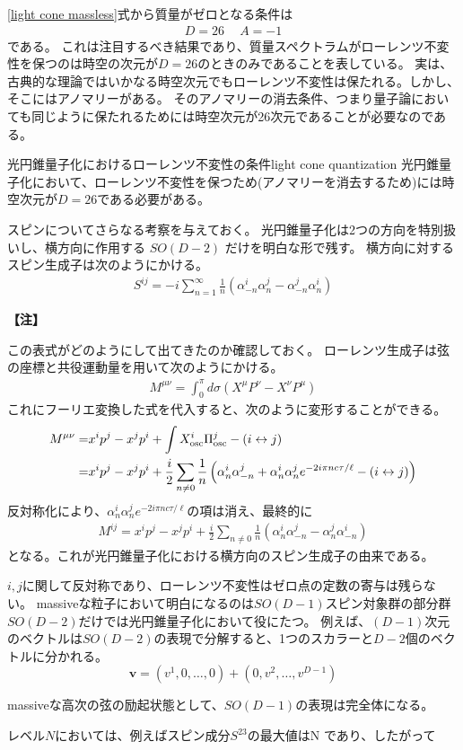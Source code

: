\documentclass[11pt, dvipdfmx]{article}
\numberwithin{equation}{section}
\newcommand{\blankline}{\par\vspace{\baselineskip}} %
\newenvironment{note}{
    \vspace{1ex} %
    \par\footnotesize\noindent\textbf{【注】}
}{
    \par\vspace{1ex} %
}
\begin{document}
\eqref{light cone massless}式から質量がゼロとなる条件は
\begin{align}
  D = 26\ \quad A=-1
\end{align}
である。
これは注目するべき結果であり、質量スペクトラムがローレンツ不変性を保つのは時空の次元が$D=26$のときのみであることを表している。
実は、古典的な理論ではいかなる時空次元でもローレンツ不変性は保たれる。しかし、そこにはアノマリーがある。
そのアノマリーの消去条件、つまり量子論においても同じように保たれるためには時空次元が26次元であることが必要なのである。
\begin{mythm}{光円錐量子化におけるローレンツ不変性の条件}{light cone quantization}
    光円錐量子化において、ローレンツ不変性を保つため(アノマリーを消去するため)には時空次元が$D=26$である必要がある。
\end{mythm}
スピンについてさらなる考察を与えておく。
光円錐量子化は2つの方向を特別扱いし、横方向に作用する $SO(D-2)$ だけを明白な形で残す。
横方向に対するスピン生成子は次のようにかける。
\begin{align}
    S^{ij} = -i \sum_{n=1}^{\infty} \frac{1}{n} \left( \alpha^i_{-n} \alpha^j_n - \alpha^j_{-n} \alpha^i_n \right)
\end{align}
\begin{note}
    この表式がどのようにして出てきたのか確認しておく。
    ローレンツ生成子は弦の座標と共役運動量を用いて次のようにかける。
    \begin{align}
        M^{\mu\nu} = \int_0^\pi d\sigma \left( X^\mu P^\nu - X^\nu P^\mu \right)
    \end{align}
    これにフーリエ変換した式を代入すると、次のように変形することができる。
    \begin{align}
        M^{\mu\nu}=&x^ip^j - x^jp^i+\int X^i_{\text{osc}}\Pi^j_{\text{osc}} -(i \leftrightarrow j)\notag\\
        =& x^ip^j - x^jp^i+\frac{i}{2}\sum_{n\neq0}\frac{1}{n}\left(\alpha^i_n\alpha^j_{-n} + \alpha^i_n\alpha^j_n e^{-2i\pi nc\tau/\ell}- (i \leftrightarrow j)\right)
    \end{align}
   反対称化により、$\alpha^i_n\alpha^j_n e^{-2i\pi nc\tau/\ell}$の項は消え、最終的に
   \begin{align}
       M^{ij} = x^i p^j - x^j p^i + \frac{i}{2} \sum_{n\neq0} \frac{1}{n} \left( \alpha^i_n \alpha^j_{-n} - \alpha^j_n \alpha^i_{-n} \right)
   \end{align}
   となる。これが光円錐量子化における横方向のスピン生成子の由来である。
\end{note}
    $i,j$に関して反対称であり、ローレンツ不変性はゼロ点の定数の寄与は残らない。
   massiveな粒子において明白になるのは$SO(D-1)$スピン対象群の部分群$SO(D-2)$だけでは光円錐量子化において役にたつ。
   例えば、$(D-1)$次元のベクトルは$SO(D-2)$の表現で分解すると、1つのスカラーと$D-2$個のベクトルに分かれる。
   \[\mathbf v = (v^1, 0, \dots, 0) + (0, v^2, \dots, v^{D-1})\]
\blankline
   massiveな高次の弦の励起状態として、$SO(D-1)$の表現は完全体になる。
\blankline
   レベル$N$においては、例えばスピン成分$S^{23}$の最大値はN
   であり、したがって
\end{document}
